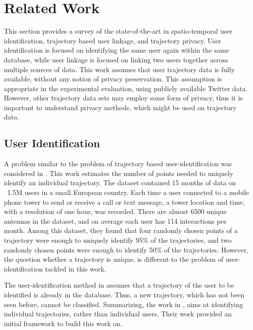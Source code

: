 
\chapter[Related Work]{Related Work}
\label{sec:rw}
This section provides a survey of the state-of-the-art in spatio-temporal user identification, trajectory based user linkage, and trajectory privacy. User identification is focused on identifying the same user again within the same database, while user linkage is focused on linking two users together across multiple sources of data. This work assumes that user trajectory data is fully available, without any notion of privacy preservation. This assumption is appropriate in the experimental evaluation, using publicly available Twitter data. However, other trajectory data sets may employ some form of privacy, thus it is important to understand privacy methods, which might be used on trajectory data.

\section{User Identification}
A problem similar to the problem of trajectory based user-identification was considered in \citeauthor{DeMontjoye2013} \cite{DeMontjoye2013}. This work estimates the number of points needed to uniquely identify an individual trajectory. The dataset contained 15 months of data on ~1.5M users in a small European country. Each time a user connected to a mobile phone tower to send or receive a call or text message, a tower location and time, with a resolution of one hour, was recorded. There are almost 6500 unique antennas in the dataset, and on average each user has 114 interactions per month. Among this dataset, they found that four randomly chosen points of a trajectory were enough to uniquely identify 95\% of the trajectories, and two randomly chosen points were enough to identify 50\% of the trajectories. However, the question whether a trajectory is unique, is different to the problem of user-identification tackled in this work.

The user-identification method in \citeauthor{DeMontjoye2013} assumes that a trajectory of the user to be identified is already in the database. Thus, a new trajectory, which has not been seen before, cannot be classified. Summarizing, the work in \citeauthor{DeMontjoye2013}, aims at identifying individual trajectories, rather than individual users. Their work provided an initial framework to build this work on.

